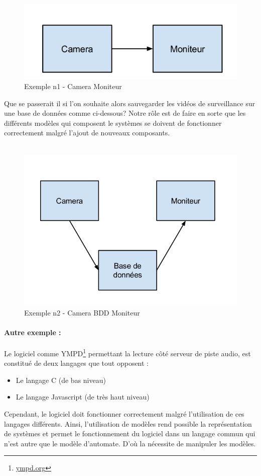 \documentclass[12pt,a4paper]{report}
\begin{document}
\begin{figure}[h]
	\centering
	\includegraphics[scale=0.5]{ressources/camera-moniteur.png}
	\caption{Exemple n1 - Camera Moniteur}
\end{figure}
Que se passerait il si l'on souhaite alors sauvegarder les vidéos de surveillance sur une base de données comme ci-dessous?
Notre rôle est de faire en sorte que les différents modèles qui composent le systèmes se doivent de fonctionner correctement malgré l'ajout de nouveaux composants. \\\\
\begin{figure}[!h]
	\centering
	\includegraphics[scale=0.5]{ressources/camera-bdd-moniteur.png}
	\caption{Exemple n2 - Camera BDD  Moniteur}
\end{figure}


\paragraph*{Autre exemple :\\}

Le logiciel comme YMPD\footnote{\href{http://www.ympd.org}{ympd.org}} permettant la lecture côté serveur de piste audio, est constitué de deux langages que tout opposent : \begin{itemize}
  \item Le langage C (de bas niveau)
  \item Le langage Javascript (de très haut niveau)
\end{itemize}
Cependant, le logiciel doit fonctionner correctement malgré l'utilisation de ces langages différents. 
Ainsi, l'utilisation de modèles rend possible la représentation de systèmes et permet 
le fonctionnement du logiciel dans un langage commun qui n'est autre que le modèle d'automate.
D'où la nécessite de manipuler les modèles.
\end{document}
